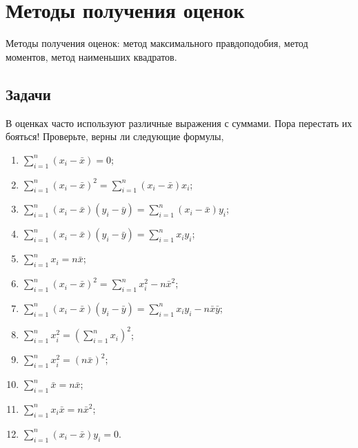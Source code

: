\documentclass[12pt]{article}
\begin{document}

\tableofcontents{}



\section{Методы получения оценок}

Методы получения оценок: метод максимального правдоподобия, метод моментов, метод наименьших квадратов.



\subsection{Задачи}
\begin{problem}
В оценках часто используют различные выражения с суммами. 
Пора перестать их бояться!
Проверьте, верны ли следующие формулы,
\begin{enumerate}
\item $\sum_{i=1}^n {(x_i-\bar x)} = 0$;
\item $\sum_{i=1}^n {(x_i-\bar x)^2} = \sum_{i=1}^n {(x_i-\bar x)x_i}$;
\item $\sum_{i=1}^n {(x_i-\bar x)(y_i-\bar y)} = \sum_{i=1}^n {(x_i-\bar x)y_i}$;
\item $\sum_{i=1}^n {(x_i-\bar x)(y_i-\bar y)} = \sum_{i=1}^n {x_i y_i}$;
\item $\sum_{i=1}^n x_i = n\bar x$;
\item $\sum_{i=1}^n (x_i - \bar x)^2 = \sum_{i=1}^n x_i^2 - n \bar x^2$;
\item $\sum_{i=1}^n (x_i - \bar x)(y_i - \bar y) = \sum_{i=1}^n x_i y_i - n \bar x \bar y$;
\item $\sum_{i=1}^n x_i^2 = \left( \sum_{i=1}^n x_i \right)^2$;
\item $\sum_{i=1}^n x_i^2 = (n\bar x)^2$;
\item $\sum_{i=1}^n \bar x = n \bar x$;
\item $\sum_{i=1}^n x_i \bar x = n \bar x^2$;
\item $\sum_{i=1}^n {(x_i-\bar x)y_i} = 0$.
\end{enumerate}

    \begin{sol}
    \end{sol}
\end{problem}
\end{document}
